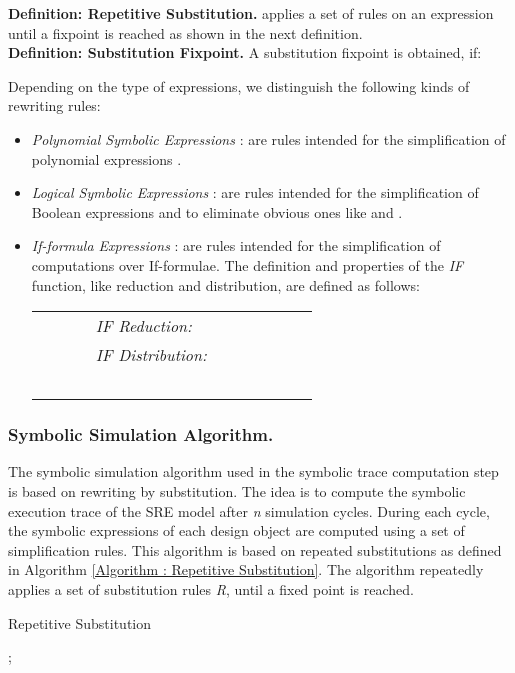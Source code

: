 \documentclass[submission,copyright,creativecommons]{eptcs}
\begin{document}
\noindent \textbf{Definition: Repetitive Substitution.}
 applies a set of rules  on an expression  until a fixpoint is reached as shown in the next definition.\\

\noindent \textbf{Definition: Substitution Fixpoint.}
A substitution fixpoint  is obtained, if: 

\noindent Depending on the type of expressions, we distinguish the following kinds of rewriting
rules: \begin{itemize}
  \item \emph{Polynomial Symbolic Expressions} : are rules intended for the simplification of polynomial expressions .
  \item \emph{Logical Symbolic Expressions} : are rules intended for the simplification of Boolean expressions and to eliminate obvious ones like  and .
  \item \emph{If-formula Expressions} : are rules intended for the simplification of computations over If-formulae. The definition and properties of the \emph{IF} function, like reduction and distribution, are defined as follows: \\
\begin{tabular}{ll}
  ~~~~~ & \emph{IF Reduction:} ~~~ \\
  ~~~~~ & \emph{IF Distribution:} \\
  ~~~~~ & ~~~~~~~~~~~~~~~~~~~~~~~~~~ \\
\end{tabular}
  \end{itemize}


\subsubsection{Symbolic Simulation Algorithm.}
The symbolic simulation algorithm used in the symbolic trace computation step is based on rewriting by substitution. The idea is to compute the symbolic execution trace of the SRE model after \emph{n} simulation cycles. During each cycle, the symbolic expressions of each design object are computed using a set of simplification rules. This algorithm is based on repeated substitutions as defined in Algorithm \ref{Algorithm : Repetitive Substitution}. The algorithm repeatedly applies a set of substitution rules \emph{R}, until a fixed point is reached.
\begin{algorithm}
\caption{Repetitive Substitution}
\label{Algorithm : Repetitive Substitution}
\begin{algorithmic}[1]
\STATE ;
\STATE 
\REPEAT
\STATE 
\STATE 
\UNTIL 
\STATE 
\end{algorithmic}
\end{algorithm}
\end{document}
